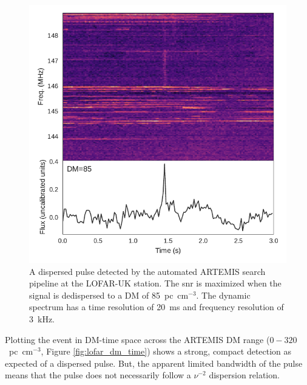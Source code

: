 \documentclass[a4paper,fleqn,usenatbib]{mnras}
\begin{document}
\begin{figure}
    \includegraphics[width=1.0\linewidth]{figures/LOFAR_dynamic_dedisp.pdf}
    \caption{A dispersed pulse detected by the automated ARTEMIS search pipeline
    at the LOFAR-UK station. The \gls{snr} is maximized when the signal is
    dedispersed to a DM of 85~pc~cm$^{-3}$. The dynamic spectrum has a time
    resolution of 20~ms and frequency resolution of 3~kHz.
    }
    \label{fig:lofar_dynamic}
\end{figure}

Plotting the event in DM-time space across the ARTEMIS DM range
($0-320$~pc~cm$^{-3}$, Figure \ref{fig:lofar_dm_time}) shows a strong, compact
detection as expected of a dispersed pulse. But, the apparent limited bandwidth
of the pulse means that the pulse does not necessarily follow a $\nu^{-2}$
dispersion relation.
\end{document}

